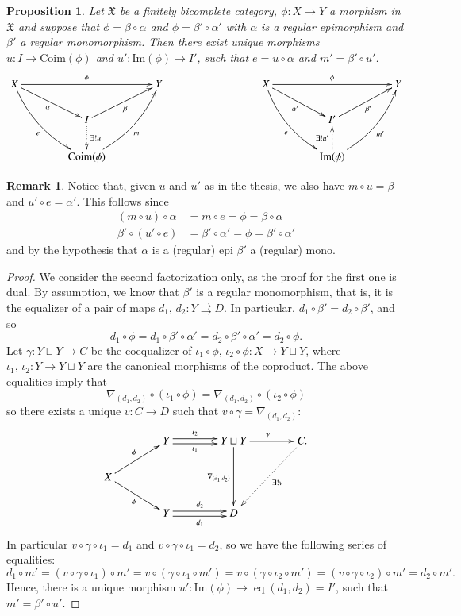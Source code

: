 \documentclass[12pt]{article}
\newtheorem{proposition}[lemma]{Proposition}
\theoremstyle{definition}
\newtheorem{remark}[lemma]{Remark}
\def\X{\mathfrak X}
\def\Coim{\mathrm{Coim}}
\def\Im{\mathrm{Im}}
\DeclareMathOperator{\eq}{eq}
\numberwithin{equation}{section}
\begin{document}
\begin{proposition}\label{univ_prop_facts_lemma}
Let $\X$ be a finitely bicomplete category, $\phi\colon X\to Y$ a morphism in $\X$ and suppose that $\phi=\beta\circ \alpha$ and $\phi=\beta'\circ \alpha'$ with $\alpha$ is a regular epimorphism and $\beta'$ a regular monomorphism. 
Then there exist unique morphisms $u\colon I\to \Coim(\phi)$ and $u'\colon \Im(\phi)\to I'$, such that $e=u\circ \alpha$ and $m'=\beta'\circ u'$.
\[
\xymatrix@C=40pt@R=20pt{
X \ar[rr]^\phi\ar[dr]_{\alpha} \ar@/_10pt/[ddr]_{e}&  & Y &&X\ar@/_10pt/[ddr]_{e} \ar[rr]^\phi\ar[dr]_{\alpha'}&  & Y \\ 
& I \ar[ur]_{\beta} \ar@{.>}[d]^-{\exists!u} &&&& I' \ar[ur]_{\beta'} & \\&\Coim(\phi) \ar@/_10pt/[uur]_{m}&&&& \Im(\phi)\ar@/_10pt/[uur]_{m'}\ar@{.>}[u]^-{\exists!u'}
}
\]
\end{proposition}
\begin{remark}\label{univ_prop_facts_lemma_2} Notice that, given $u$ and $u'$ as in the thesis, we also have $m\circ u=\beta$ and $u'\circ e=\alpha'$. This follows since
	\begin{align*}
		(m\circ u)\circ \alpha&=m\circ e=\phi =\beta \circ \alpha \\
		\beta'\circ (u'\circ e)&=\beta'\circ \alpha'=\phi =\beta'\circ \alpha'
	\end{align*}
	and by the hypothesis that $\alpha$ is a (regular) epi $\beta'$ a (regular) mono.
\end{remark}
\begin{proof}
We consider the second factorization only, as the proof for the first one is dual. By assumption, we know that $\beta'$ is a regular monomorphism, that is, it is the equalizer of a pair of maps $d_1,\, d_2\colon Y\rightrightarrows D$. In particular, $d_1\circ\beta'=d_2\circ\beta'$, and so 
\[
d_1\circ\phi=d_1\circ\beta'\circ\alpha'=d_2\circ\beta'\circ\alpha'=d_2\circ\phi.
\] 
Let $\gamma\colon Y\sqcup Y\to C$ be the coequalizer of $\iota_1\circ\phi,\, \iota_2\circ\phi\colon X\to Y\sqcup Y$, where $\iota_1,\,\iota_2\colon Y\to Y\sqcup Y$ are the canonical morphisms of the coproduct. The above equalities imply that
\[\nabla_{(d_1,d_2)}\circ (\iota_1\circ \phi)=\nabla_{(d_1,d_2)}\circ (\iota_2\circ \phi)\] so there exists a unique $v\colon C\to D$ such that $v\circ\gamma=\nabla_{(d_1,d_2)}$:
\[
\xymatrix@R=20pt@C=40pt{
  &Y \ar@<-.5ex>[r]_-{\iota_1} \ar@<.5ex>[r]^-{\iota_2}  & Y\sqcup Y\ar[dd]_{\nabla_{(d_1,d_2)}} \ar[r]^{\gamma}&C.\ar@{.>}[ddl]^-{\exists!v}\\ 
  X  \ar[ur]^{\phi} \ar[dr]_\phi\\
&Y\ar@<-.5ex>[r]_{d_1} \ar@<.5ex>[r]^{d_2} & D  
}
\]
In particular $v\circ \gamma \circ \iota_1=d_1$ and $v\circ \gamma \circ \iota_1=d_2$, so we have the following series of equalities:
\[
d_1\circ m'=(v\circ  \gamma\circ   \iota_1)\circ  m'=v\circ  (\gamma\circ   \iota_1\circ  m')=v\circ  (\gamma\circ   \iota_2\circ  m')=(v\circ  \gamma\circ   \iota_2)\circ  m'=d_2\circ  m'.
\]
Hence, there is a unique morphism $u'\colon \Im(\phi)\to \eq(d_1,d_2)=I'$, such that $m'=\beta' \circ u'$.
\end{proof}
\end{document}
